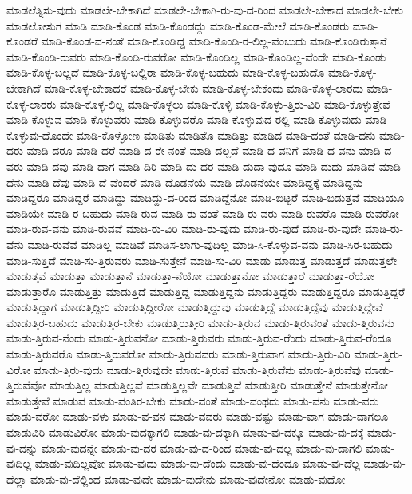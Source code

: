 {ಮಾಡಲೆತ್ನಿಸು-ವುದು
ಮಾಡಲೇ-ಬೇಕಾಗಿದೆ
ಮಾಡಲೇ-ಬೇಕಾಗಿ-ರು-ವು-ದ-ರಿಂದ
ಮಾಡಲೇ-ಬೇಕಾದ
ಮಾಡಲೇ-ಬೇಕು
ಮಾಡಲೋಸುಗ
ಮಾಡಿ
ಮಾಡಿ-ಕೊಂಡ
ಮಾಡಿ-ಕೊಂಡದ್ದು
ಮಾಡಿ-ಕೊಂಡ-ಮೇಲೆ
ಮಾಡಿ-ಕೊಂಡರು
ಮಾಡಿ-ಕೊಂಡರೆ
ಮಾಡಿ-ಕೊಂಡ-ವ-ನಂತೆ
ಮಾಡಿ-ಕೊಂಡಿದ್ದ
ಮಾಡಿ-ಕೊಂಡಿ-ರ-ಲಿಲ್ಲ-ವೆಂಬುದು
ಮಾಡಿ-ಕೊಂಡಿರುತ್ತಾನೆ
ಮಾಡಿ-ಕೊಂಡಿ-ರುವರು
ಮಾಡಿ-ಕೊಂಡಿ-ರುವರೋ
ಮಾಡಿ-ಕೊಂಡಿಲ್ಲ
ಮಾಡಿ-ಕೊಂಡಿಲ್ಲ-ವೆಂದೇ
ಮಾಡಿ-ಕೊಂಡು
ಮಾಡಿ-ಕೊಳ್ಳ-ಬಲ್ಲದೆ
ಮಾಡಿ-ಕೊಳ್ಳ-ಬಲ್ಲಿರಾ
ಮಾಡಿ-ಕೊಳ್ಳ-ಬಹುದು
ಮಾಡಿ-ಕೊಳ್ಳ-ಬಹುದೊ
ಮಾಡಿ-ಕೊಳ್ಳ-ಬೇಕಾಗಿದೆ
ಮಾಡಿ-ಕೊಳ್ಳ-ಬೇಕಾದರೆ
ಮಾಡಿ-ಕೊಳ್ಳ-ಬೇಕು
ಮಾಡಿ-ಕೊಳ್ಳ-ಬೇಕೆಂದು
ಮಾಡಿ-ಕೊಳ್ಳ-ಲಾರದು
ಮಾಡಿ-ಕೊಳ್ಳ-ಲಾರರು
ಮಾಡಿ-ಕೊಳ್ಳ-ಲಿಲ್ಲ
ಮಾಡಿ-ಕೊಳ್ಳಲು
ಮಾಡಿ-ಕೊಳ್ಳಿ
ಮಾಡಿ-ಕೊಳ್ಳು-ತ್ತಿರು-ವಿರಿ
ಮಾಡಿ-ಕೊಳ್ಳುತ್ತೇವೆ
ಮಾಡಿ-ಕೊಳ್ಳುವ
ಮಾಡಿ-ಕೊಳ್ಳುವರು
ಮಾಡಿ-ಕೊಳ್ಳುವರೊ
ಮಾಡಿ-ಕೊಳ್ಳುವುದ-ರಲ್ಲಿ
ಮಾಡಿ-ಕೊಳ್ಳುವುದು
ಮಾಡಿ-ಕೊಳ್ಳುವು-ದೊಂದೇ
ಮಾಡಿ-ಕೊಳ್ಳೋಣ
ಮಾಡಿತು
ಮಾಡಿತೊ
ಮಾಡಿತ್ತು
ಮಾಡಿದ
ಮಾಡಿ-ದಂತೆ
ಮಾಡಿ-ದನು
ಮಾಡಿ-ದರು
ಮಾಡಿ-ದರೂ
ಮಾಡಿ-ದರೆ
ಮಾಡಿ-ದ-ರೇ-ನಂತೆ
ಮಾಡಿ-ದಲ್ಲದೆ
ಮಾಡಿ-ದ-ವನಿಗೆ
ಮಾಡಿ-ದ-ವನು
ಮಾಡಿ-ದ-ವರು
ಮಾಡಿ-ದವು
ಮಾಡಿ-ದಾಗ
ಮಾಡಿ-ದಿರಿ
ಮಾಡಿ-ದು-ದರ
ಮಾಡಿ-ದುದಾ-ವುದೂ
ಮಾಡಿ-ದುದು
ಮಾಡಿದೆ
ಮಾಡಿ-ದೆನು
ಮಾಡಿ-ದೆವು
ಮಾಡಿ-ದೆ-ವೆಂದರೆ
ಮಾಡಿ-ದೊಡನೆಯೆ
ಮಾಡಿ-ದೊಡನೆಯೇ
ಮಾಡಿದ್ದಕ್ಕೆ
ಮಾಡಿದ್ದನು
ಮಾಡಿದ್ದರೂ
ಮಾಡಿದ್ದರೆ
ಮಾಡಿದ್ದು
ಮಾಡಿದ್ದು-ದ-ರಿಂದ
ಮಾಡಿದ್ದೆನೋ
ಮಾಡಿ-ಬಿಟ್ಟರೆ
ಮಾಡಿ-ಬಿಡುತ್ತವೆ
ಮಾಡಿಯೂ
ಮಾಡಿಯೇ
ಮಾಡಿ-ರ-ಬಹುದು
ಮಾಡಿ-ರುವ
ಮಾಡಿ-ರು-ವಂತೆ
ಮಾಡಿ-ರು-ವರು
ಮಾಡಿ-ರುವರೊ
ಮಾಡಿ-ರುವರೋ
ಮಾಡಿ-ರುವ-ವನು
ಮಾಡಿ-ರುವವೆ
ಮಾಡಿ-ರು-ವಿರಿ
ಮಾಡಿ-ರು-ವುದು
ಮಾಡಿ-ರು-ವುದೆ
ಮಾಡಿ-ರು-ವುದೇ
ಮಾಡಿ-ರು-ವೆನು
ಮಾಡಿ-ರುವೆವೆ
ಮಾಡಿಲ್ಲ
ಮಾಡಿವೆ
ಮಾಡಿಸ-ಲಾಗು-ವುದಿಲ್ಲ
ಮಾಡಿ-ಸಿ-ಕೊಳ್ಳುವ-ವನು
ಮಾಡಿ-ಸಿರ-ಬಹುದು
ಮಾಡಿ-ಸುತ್ತಿದೆ
ಮಾಡಿ-ಸು-ತ್ತಿರುವರು
ಮಾಡಿ-ಸುತ್ತೇನೆ
ಮಾಡಿ-ಸು-ವಿರಿ
ಮಾಡು
ಮಾಡುತ್ತ
ಮಾಡುತ್ತದೆ
ಮಾಡುತ್ತಲೇ
ಮಾಡುತ್ತವೆ
ಮಾಡುತ್ತಾ
ಮಾಡುತ್ತಾನೆ
ಮಾಡುತ್ತಾ-ನೆಯೋ
ಮಾಡುತ್ತಾನೋ
ಮಾಡುತ್ತಾರೆ
ಮಾಡುತ್ತಾ-ರೆಯೋ
ಮಾಡುತ್ತಾರೊ
ಮಾಡುತ್ತಿತ್ತು
ಮಾಡುತ್ತಿದೆ
ಮಾಡುತ್ತಿದ್ದ
ಮಾಡುತ್ತಿದ್ದನು
ಮಾಡುತ್ತಿದ್ದರು
ಮಾಡುತ್ತಿದ್ದರೂ
ಮಾಡುತ್ತಿದ್ದರೆ
ಮಾಡುತ್ತಿದ್ದಾಗ
ಮಾಡುತ್ತಿದ್ದೀರಿ
ಮಾಡುತ್ತಿದ್ದೀರೋ
ಮಾಡುತ್ತಿದ್ದುವು
ಮಾಡುತ್ತಿದ್ದೆ
ಮಾಡುತ್ತಿದ್ದೆವು
ಮಾಡುತ್ತಿದ್ದೇವೆ
ಮಾಡುತ್ತಿರ-ಬಹುದು
ಮಾಡುತ್ತಿರ-ಬೇಕು
ಮಾಡುತ್ತಿರುತ್ತೀರಿ
ಮಾಡು-ತ್ತಿರುವ
ಮಾಡು-ತ್ತಿರುವಂತೆ
ಮಾಡು-ತ್ತಿರುವನು
ಮಾಡು-ತ್ತಿರುವ-ನೆಂದು
ಮಾಡು-ತ್ತಿರುವನೋ
ಮಾಡು-ತ್ತಿರುವರು
ಮಾಡು-ತ್ತಿರುವ-ರೆಂದು
ಮಾಡು-ತ್ತಿರುವ-ರೆಂದೂ
ಮಾಡು-ತ್ತಿರುವರೊ
ಮಾಡು-ತ್ತಿರುವರೋ
ಮಾಡು-ತ್ತಿರುವವರು
ಮಾಡು-ತ್ತಿರುವಾಗ
ಮಾಡು-ತ್ತಿರು-ವಿರಿ
ಮಾಡು-ತ್ತಿರು-ವಿರೋ
ಮಾಡು-ತ್ತಿರು-ವುದು
ಮಾಡು-ತ್ತಿರುವುದೇ
ಮಾಡು-ತ್ತಿರುವೆ
ಮಾಡು-ತ್ತಿರುವೆನು
ಮಾಡು-ತ್ತಿರುವೆವು
ಮಾಡು-ತ್ತಿರುವೆವೋ
ಮಾಡುತ್ತಿಲ್ಲ
ಮಾಡುತ್ತಿಲ್ಲವೆ
ಮಾಡುತ್ತಿಲ್ಲವೇ
ಮಾಡುತ್ತಿವೆ
ಮಾಡುತ್ತೀರಿ
ಮಾಡುತ್ತೇನೆ
ಮಾಡುತ್ತೇನೋ
ಮಾಡುತ್ತೇವೆ
ಮಾಡುವ
ಮಾಡು-ವಂತಿರ-ಬೇಕು
ಮಾಡು-ವಂತೆ
ಮಾಡು-ವಂಥದು
ಮಾಡು-ವನು
ಮಾಡು-ವರು
ಮಾಡು-ವರೋ
ಮಾಡು-ವಳು
ಮಾಡು-ವ-ವನ
ಮಾಡು-ವವರು
ಮಾಡು-ವಷ್ಟು
ಮಾಡು-ವಾಗ
ಮಾಡು-ವಾಗಲೂ
ಮಾಡುವಿರಿ
ಮಾಡುವಿರೋ
ಮಾಡು-ವುದಕ್ಕಾಗಲಿ
ಮಾಡು-ವು-ದಕ್ಕಾಗಿ
ಮಾಡು-ವು-ದಕ್ಕೂ
ಮಾಡು-ವು-ದಕ್ಕೆ
ಮಾಡು-ವು-ದನ್ನು
ಮಾಡು-ವುದನ್ನೇ
ಮಾಡು-ವು-ದರ
ಮಾಡು-ವು-ದ-ರಿಂದ
ಮಾಡು-ವು-ದಲ್ಲ
ಮಾಡು-ವು-ದಾಗಲಿ
ಮಾಡು-ವುದಿಲ್ಲ
ಮಾಡು-ವುದಿಲ್ಲವೋ
ಮಾಡು-ವುದು
ಮಾಡು-ವು-ದೆಂದು
ಮಾಡು-ವು-ದೆಂದೂ
ಮಾಡು-ವು-ದೆಲ್ಲ
ಮಾಡು-ವು-ದೆಲ್ಲಾ
ಮಾಡು-ವು-ದೆಲ್ಲಿಂದ
ಮಾಡು-ವುದೇ
ಮಾಡು-ವುದೇನು
ಮಾಡು-ವುದೇನೋ
ಮಾಡು-ವುದೋ
}
